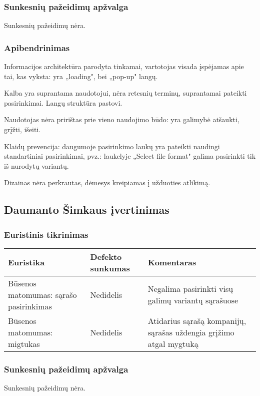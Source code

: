 \documentclass{VUMIFPSkursinis}
\begin{document}
\subsubsection{Sunkesnių pažeidimų apžvalga}
Sunkesnių pažeidimų nėra.

\subsubsection{Apibendrinimas}
Informacijos architektūra parodyta tinkamai, vartotojas visada įspėjamas apie tai, kas vyksta: yra „loading", bei „pop-up" langų.

Kalba yra suprantama naudotojui, nėra retesnių terminų, suprantamai pateikti pasirinkimai. Langų struktūra pastovi.

Naudotojas nėra pririštas prie vieno naudojimo būdo: yra galimybė atšaukti, grįžti, išeiti.

Klaidų prevencija: daugumoje pasirinkimo laukų yra pateikti naudingi standartiniai pasirinkimai, pvz.: laukelyje „Select file format" galima pasirinkti tik iš nurodytų variantų.

Dizainas nėra perkrautas, dėmesys kreipiamas į užduoties atlikimą.

\subsection{Daumanto Šimkaus įvertinimas}
\subsubsection{Euristinis tikrinimas}
\begin{center}
 \begin{tabular}{|| p{4cm} | p{4cm} | p{8cm} ||} 
 \hline
 Euristika & Defekto sunkumas & Komentaras \\
 \hline\hline
 Būsenos matomumas: sąrašo pasirinkimas & Nedidelis & Negalima pasirinkti visų galimų variantų sąrašuose\\ 
 \hline
 Būsenos matomumas: migtukas & Nedidelis & Atidarius sąrašą kompanijų, sąrašas uždengia grįžimo atgal mygtuką\\ 
 \hline
\end{tabular}	
\end{center}

\subsubsection{Sunkesnių pažeidimų apžvalga}
Sunkesnių pažeidimų nėra.
\end{document}
